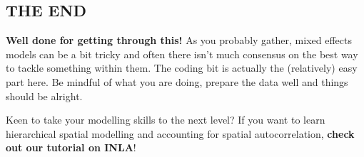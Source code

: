 \documentclass[
]{article}
\begin{document}
\subsection{THE END}\label{the-end}

\textbf{Well done for getting through this!} As you probably gather,
mixed effects models can be a bit tricky and often there isn't much
consensus on the best way to tackle something within them. The coding
bit is actually the (relatively) easy part here. Be mindful of what you
are doing, prepare the data well and things should be alright.

Keen to take your modelling skills to the next level? If you want to
learn hierarchical spatial modelling and accounting for spatial
autocorrelation, \textbf{check out our tutorial on INLA}!
\end{document}
